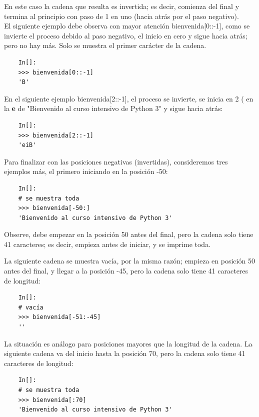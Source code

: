 \noindent En este caso la cadena que resulta es invertida; es decir, comienza del final y termina al principio con paso de 1 en uno (hacia atrás por el paso negativo).\\

El siguiente ejemplo debe observa con mayor atención {\ttfamily  bienvenida[0::-1]}, como se invierte el proceso debido al paso negativo, el inicio en cero y  sigue hacia atrás; pero no hay más.  
Solo se muestra el primer carácter de la cadena. 

\begin{lstlisting}
	In[]:	
	>>> bienvenida[0::-1]
	'B'
\end{lstlisting}

En el siguiente ejemplo {\ttfamily  bienvenida[2::-1]}, el proceso se invierte, se inicia en 2 ( en la {\bf{e}} de  {\ttfamily "Bienvenido al curso intensivo de Python 3"{}}  y  sigue hacia atrás: 

\begin{lstlisting}
	In[]:
	>>> bienvenida[2::-1]
	'eiB'
\end{lstlisting}

Para finalizar con las posiciones negativas (invertidas), consideremos tres ejemplos más, el primero iniciando en la posición -50:

\begin{lstlisting}
	In[]:
	# se muestra toda 	
	>>> bienvenida[-50:]
	'Bienvenido al curso intensivo de Python 3'
\end{lstlisting}

Observe, debe empezar en la posición 50 antes del final, pero la cadena solo tiene 41 caracteres; es decir,  
empieza antes de iniciar, y se imprime toda.

La siguiente cadena se muestra vacía, por la misma razón; empieza en posición 50 antes del final,  y llegar a la posición -45, pero la cadena solo tiene 41 caracteres de longitud:

\begin{lstlisting}	
	In[]:  
	# vacía	
	>>> bienvenida[-51:-45]
	''
\end{lstlisting}

La situación es análogo para posiciones mayores que la longitud de la cadena. La siguiente cadena va del inicio  hasta la posición 70,  pero la cadena solo tiene 41 caracteres de longitud: 

\begin{lstlisting}
	In[]:
	# se muestra toda
	>>> bienvenida[:70]
	'Bienvenido al curso intensivo de Python 3'
	
\end{lstlisting}


